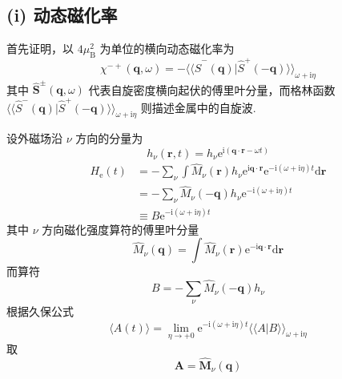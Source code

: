 \subsection*{(i) 动态磁化率}

首先证明，以 $4\mu_{\mathrm{B}}^{2}$ 为单位的横向动态磁化率为
\begin{equation}
  \chi^{-+}(\boldsymbol{q},\omega)=-\langle\langle\hat{S}^{-}(\boldsymbol{q})|\hat{S}^{+}(-\boldsymbol{q})\rangle\rangle_{\omega+\mathrm{i}\eta}
\end{equation}
其中 $\hat{\boldsymbol{S}}^{\pm}(\boldsymbol{q},\omega)$ 代表自旋密度横向起伏的傅里叶分量，而格林函数 $\langle\langle\hat{S}^{-}(\boldsymbol{q})|\hat{S}^{+}(-\boldsymbol{q})\rangle\rangle_{\omega+\mathrm{i}\eta}$ 则描述金属中的自旋波.

设外磁场沿 $\nu$ 方向的分量为
\begin{equation}
  h_{\nu}(\boldsymbol{r},t)=h_{\nu}\mathrm{e}^{\mathrm{i}(\boldsymbol{q}\cdot\boldsymbol{r}-\omega t)}
\end{equation}
\begin{equation}
\begin{aligned}
  H_{\mathrm{e}}(t)&=-\sum_{\nu}\int\hat{M}_{\nu}(\boldsymbol{r})h_{\nu}\mathrm{e}^{\mathrm{i}\boldsymbol{q}\cdot\boldsymbol{r}}
  \mathrm{e}^{-\mathrm{i}(\omega+\mathrm{i}\eta)t}\mathrm{d}\boldsymbol{r}\\
  &=-\sum_{\nu}\hat{M}_{\nu}(-\boldsymbol{q})h_{\nu}\mathrm{e}^{-\mathrm{i}(\omega+\mathrm{i}\eta)t}\\
  &\equiv B\mathrm{e}^{-\mathrm{i}(\omega+\mathrm{i}\eta)t}
\end{aligned}
\end{equation}
其中 $\nu$ 方向磁化强度算符的傅里叶分量
\begin{equation}
  \hat{M}_{\nu}(\boldsymbol{q})=\int\hat{M}_{\nu}(\boldsymbol{r})\mathrm{e}^{-\mathrm{i}\boldsymbol{q}\cdot\boldsymbol{r}}\mathrm{d}\boldsymbol{r}
\end{equation}
而算符
\begin{equation}
  B=-\sum_{\nu}\hat{M}_{\nu}(-\boldsymbol{q})h_{\nu}
\end{equation}
根据久保公式
\begin{equation}
  \langle A(t)\rangle=\lim_{\eta\to+0}\mathrm{e}^{-\mathrm{i}(\omega+\mathrm{i}\eta)t}
  \langle\langle A|B\rangle\rangle_{\omega+\mathrm{i}\eta}
\end{equation}
取
\begin{equation}
  \boldsymbol{A}=\hat{\boldsymbol{M}}_{\nu}(\boldsymbol{q})
\end{equation}
